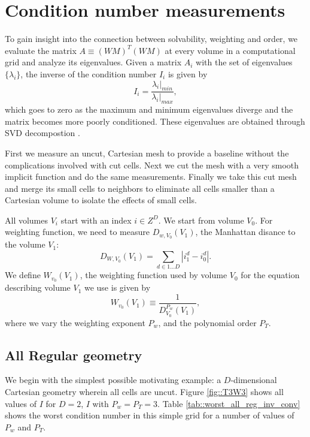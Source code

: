 \documentclass{article}
\begin{document}
\section{Condition number measurements}

To gain insight into the connection between solvability, weighting and
order, we evaluate the matrix $A \equiv (WM)^T(WM)$
at every volume in a computational grid and analyze its
eigenvalues.   Given a matrix $A_i$ with the set of eigenvalues
$\{ \lambda_{i}\}$, the inverse of the condition number $I_i$ is given by
\begin{equation*}
  I_i = \frac{\lambda_i|_{min}}{\lambda_i|_{max}},
\end{equation*}
which goes to zero as the maximum and minimum eigenvalues diverge and
the matrix becomes more poorly conditioned.   These eigenvalues are
obtained through  SVD decompostion \footnotemark[7].

First we  measure   an uncut, Cartesian mesh to
provide a baseline without the complications involved with cut cells.
Next we cut the mesh with a very smooth implicit function and do the
same measurements.   Finally we take this cut mesh and merge its small
cells to neighbors to eliminate all cells smaller than a Cartesian
volume to isolate the effects of small cells.

All volumes $V_i$ start with an  index $i \in Z^D$.
We start from volume $V_0$.   For 
weighting function, we need to measure $D_{w, V_0}(V_1)$,
the Manhattan disance to the volume $V_1$:
\begin{equation}
  D_{W, V_0}(V_1) = \sum\limits_{d \in {1...D}} |i_1^d - i_0^d|.
\label{eqn::uptownFunk}
\end{equation}
We define $W_{v_0}(V_1)$, the weighting function used by volume $V_0$ for the
equation describing  volume $V_1$ we use is given by
\begin{equation}
  W_{v_0}(V_1)  \equiv \frac{1}{D^{P_w}_{V_0}(V_1)},
\label{eqn::weightFunk}  
\end{equation}
where we vary the weighting exponent $P_w$, and the 
polynomial order $P_T$.

\subsection{All Regular geometry}

We begin with the simplest possible motivating example: a
$D$-dimensional Cartesian geometry wherein all cells are uncut.
Figure \ref{fig::T3W3} shows all values of $I$ for $D=2$, $I$ with
$P_w = P_T = 3$.  Table \ref{tab::worst_all_reg_inv_conv} shows the
worst condition number in this simple grid for a number of values of
$P_w$ and $P_T$. 
\end{document}
